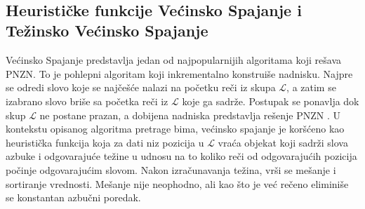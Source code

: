 \documentclass[12pt,oneside]{memoir}
\begin{document}
\\

\subsection{Heurističke funkcije Većinsko Spajanje i Težinsko Većinsko Spajanje}
\label{sec:mmiwmm}
Većinsko Spajanje predstavlja jedan od najpopularnijih algoritama koji rešava PNZN. To je pohlepni algoritam
koji inkrementalno konstruiše nadnisku. Najpre se odredi slovo koje se najčešće nalazi na početku reči
iz skupa $\mathcal{L}$, a zatim se izabrano slovo briše sa početka reči iz $\mathcal{L}$ koje ga sadrže.
Postupak se ponavlja dok skup $\mathcal{L}$ ne postane prazan, a dobijena nadniska
predstavlja rešenje PNZN \cite{ProbabilisticBS}.
U kontekstu opisanog algoritma pretrage bima, većinsko spajanje je koršćeno kao heuristička funkcija
koja za dati niz pozicija u $\mathcal{L}$ vraća objekat koji sadrži slova azbuke i odgovarajuće
težine u udnosu na to koliko reči od odgovarajućih pozicija počinje odgovarajućim slovom.
Nakon izračunavanja težina, vrši se mešanje i sortiranje vrednosti. Mešanje nije neophodno,
ali kao što je već rečeno eliminiše se konstantan azbučni poredak. 
\end{document}
